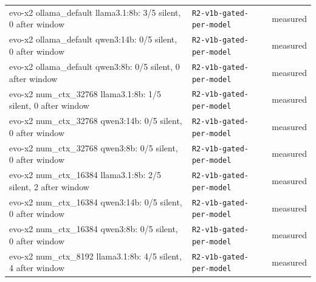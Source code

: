 \begin{longtable}{>{\raggedright\arraybackslash}p{}>{\raggedright\arraybackslash}p{}>{\raggedright\arraybackslash}p{}}
\small evo-x2 ollama\_default llama3.1:8b: 3/5 silent, 0 after window & {\footnotesize \texttt{R2-\allowbreak{}v1b-\allowbreak{}gated-\allowbreak{}per-\allowbreak{}model}} & \small measured \\

\small evo-x2 ollama\_default qwen3:14b: 0/5 silent, 0 after window & {\footnotesize \texttt{R2-\allowbreak{}v1b-\allowbreak{}gated-\allowbreak{}per-\allowbreak{}model}} & \small measured \\

\small evo-x2 ollama\_default qwen3:8b: 0/5 silent, 0 after window & {\footnotesize \texttt{R2-\allowbreak{}v1b-\allowbreak{}gated-\allowbreak{}per-\allowbreak{}model}} & \small measured \\

\small evo-x2 num\_ctx\_32768 llama3.1:8b: 1/5 silent, 0 after window & {\footnotesize \texttt{R2-\allowbreak{}v1b-\allowbreak{}gated-\allowbreak{}per-\allowbreak{}model}} & \small measured \\

\small evo-x2 num\_ctx\_32768 qwen3:14b: 0/5 silent, 0 after window & {\footnotesize \texttt{R2-\allowbreak{}v1b-\allowbreak{}gated-\allowbreak{}per-\allowbreak{}model}} & \small measured \\

\small evo-x2 num\_ctx\_32768 qwen3:8b: 0/5 silent, 0 after window & {\footnotesize \texttt{R2-\allowbreak{}v1b-\allowbreak{}gated-\allowbreak{}per-\allowbreak{}model}} & \small measured \\

\small evo-x2 num\_ctx\_16384 llama3.1:8b: 2/5 silent, 2 after window & {\footnotesize \texttt{R2-\allowbreak{}v1b-\allowbreak{}gated-\allowbreak{}per-\allowbreak{}model}} & \small measured \\

\small evo-x2 num\_ctx\_16384 qwen3:14b: 0/5 silent, 0 after window & {\footnotesize \texttt{R2-\allowbreak{}v1b-\allowbreak{}gated-\allowbreak{}per-\allowbreak{}model}} & \small measured \\

\small evo-x2 num\_ctx\_16384 qwen3:8b: 0/5 silent, 0 after window & {\footnotesize \texttt{R2-\allowbreak{}v1b-\allowbreak{}gated-\allowbreak{}per-\allowbreak{}model}} & \small measured \\

\small evo-x2 num\_ctx\_8192 llama3.1:8b: 4/5 silent, 4 after window & {\footnotesize \texttt{R2-\allowbreak{}v1b-\allowbreak{}gated-\allowbreak{}per-\allowbreak{}model}} & \small measured \\


\end{longtable}
